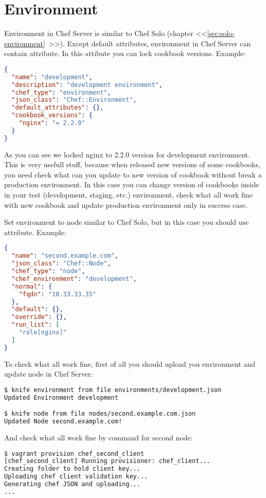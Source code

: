 \section{Environment}
\label{sec:server-environment}

Environment in Chef Server is similar to Chef Solo (chapter <<\ref{sec:solo-environment}~>>). Except default attributes, environment in Chef Server can contain  attribute. In this attibute you can lock cookbook versions. Example:

\begin{lstlisting}[language=JSON,label=lst:my-serer-cloud-environment1,title=my-server-cloud/environments/development.json]
{
  "name": "development",
  "description": "development environment",
  "chef_type": "environment",
  "json_class": "Chef::Environment",
  "default_attributes": {},
  "cookbook_versions": {
    "nginx": "= 2.2.0"
  }
}
\end{lstlisting}

As you can see we locked nginx to 2.2.0 version for development environment. This is very usefull stuff, because when released new versions of some cookbooks, you need check what can you update to new version of cookbook without break a production environment. In this case you can change version of cookbooks inside  in your test (development, staging, etc.) environment, check what all work fine with new cookbook and update production environment only in success case.

Set environment to node similar to Chef Solo, but in this case you should use  attribute. Example:

\begin{lstlisting}[language=JSON,label=lst:my-serer-cloud-environment2,title=my-server-cloud/nodes/second.example.com.json]
{
  "name": "second.example.com",
  "json_class": "Chef::Node",
  "chef_type": "node",
  "chef_environment": "development",
  "normal": {
    "fqdn": "10.33.33.35"
  },
  "default": {},
  "override": {},
  "run_list": [
    "role[nginx]"
  ]
}
\end{lstlisting}

To check what all work fine, first of all you should upload you environment and update node in Chef Server:

\begin{lstlisting}[language=Bash,label=lst:my-serer-cloud-environment3]
$ knife environment from file environments/development.json
Updated Environment development

$ knife node from file nodes/second.example.com.json
Updated Node second.example.com!
\end{lstlisting}

And check what all work fine by command  for second node:

\begin{lstlisting}[language=Bash,label=lst:my-serer-cloud-environment4]
$ vagrant provision chef_second_client
[chef_second_client] Running provisioner: chef_client...
Creating folder to hold client key...
Uploading chef client validation key...
Generating chef JSON and uploading...
...
\end{lstlisting}
